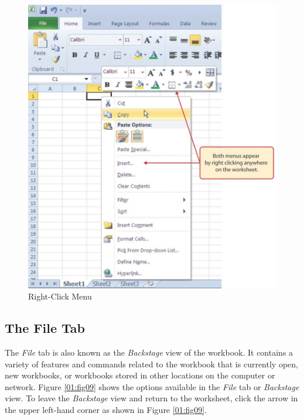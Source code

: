 \begin{figure}[H]
	\centering
	\includegraphics[width=\maxwidth{.95\linewidth}]{gfx/ch01_fig08}
	\caption{Right-Click Menu}
	\label{01:fig08}
\end{figure}

\subsection{The File Tab}

The \textit{File} tab is also known as the \textit{Backstage} view of the workbook. It contains a variety of features and commands related to the workbook that is currently open, new workbooks, or workbooks stored in other locations on the computer or network. Figure \ref{01:fig09} shows the options available in the \textit{File} tab or \textit{Backstage} view. To leave the \textit{Backstage} view and return to the worksheet, click the arrow in the upper left-hand corner as shown in Figure \ref{01:fig09}.

